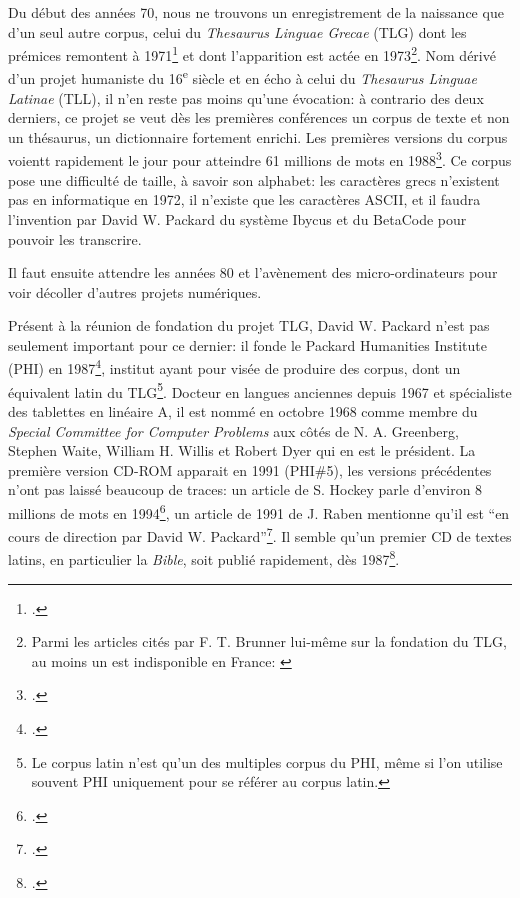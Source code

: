 Du début des années 70, nous ne trouvons un enregistrement de la naissance que d'un seul autre corpus, celui du \textit{Thesaurus Linguae Grecae} (TLG) dont les prémices remontent à 1971\footcite{brunner} et dont l'apparition est actée en 1973\footnote{Parmi les articles cités par F. T. Brunner lui-même sur la fondation du TLG, au moins un est indisponible en France: \cite{hugues}}. Nom dérivé d'un projet humaniste du 16\textsuperscript{e} siècle et en écho à celui du \textit{Thesaurus Linguae Latinae} (TLL), il n'en reste pas moins qu'une évocation: à contrario des deux derniers, ce projet se veut dès les premières conférences un corpus de texte et non un thésaurus, un dictionnaire fortement enrichi. Les premières versions du corpus voientt rapidement le jour pour atteindre 61 millions de mots en 1988\footcite{brunner_overcoming_1988}. Ce corpus pose une difficulté de taille, à savoir son alphabet: les caractères grecs  n'existent pas en informatique en 1972, il n'existe que les caractères ASCII, et il faudra l'invention par David W. Packard du système Ibycus et du BetaCode pour pouvoir les transcrire. 

Il faut ensuite attendre les années 80 et l'avènement des micro-ordinateurs pour voir décoller d'autres projets numériques. 
% 

Présent à la réunion de fondation du projet TLG, David W. Packard n'est pas seulement important pour ce dernier: il fonde le Packard Humanities Institute (PHI) en 1987\footcite{helgerson_cd-rom_1988}, institut ayant pour visée de produire des corpus, dont un équivalent latin du TLG\footnote{Le corpus latin n'est qu'un des multiples corpus du PHI, même si l'on utilise souvent PHI uniquement pour se référer au corpus latin.}. Docteur en langues anciennes depuis 1967 et spécialiste des tablettes en linéaire A, il est nommé en octobre 1968 comme membre du \textit{Special Committee for Computer Problems} aux côtés de N. A. Greenberg, Stephen Waite, William H. Willis et Robert Dyer qui en est le président. La première version CD-ROM apparait en 1991 (PHI\#5), les versions précédentes n'ont pas laissé beaucoup de traces: un article de S. Hockey parle d'environ 8 millions de mots en 1994\footcite{hockey_electronic_1994}, un article de 1991 de J. Raben mentionne qu'il est \enquote{en cours de direction par David W. Packard}\footcite{raben_humanities_1991}. Il semble qu'un premier CD de textes latins, en particulier la \textit{Bible}, soit publié rapidement, dès 1987\footcite{groves_tovs_1990, cornell_greek_1989}.

